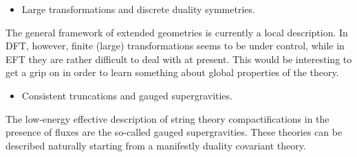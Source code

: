\documentclass{article}
\begin{document}
\begin{itemize}
    \item Large transformations and discrete duality symmetries.
\end{itemize}
The general framework of extended geometries is currently a local description. In DFT, however, finite (large) transformations seems to be under control, while in EFT they are rather difficult to deal with at present. This would be interesting to get a grip on in order to learn something about global properties of the theory.

\begin{itemize}
    \item Consistent truncations and gauged supergravities.
\end{itemize}
The low-energy effective description of string theory compactifications in the presence of fluxes are the so-called gauged supergravities. These theories can be described naturally starting from a manifestly duality covariant theory.



\newpage


\end{document}

